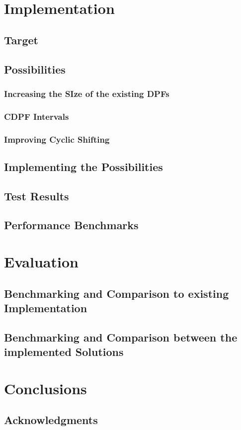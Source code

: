 \documentclass[fleqn,10pt]{olplainarticle}
\begin{document}
\section{Implementation}
\subsection{Target}

\subsection{Possibilities}

\subsubsection{Increasing the SIze of the existing DPFs}

\subsubsection{CDPF Intervals}

\subsubsection{Improving Cyclic Shifting}

\subsection{Implementing the Possibilities}

\subsection{Test Results}

\subsection{Performance Benchmarks}


\section{Evaluation}
\subsection{Benchmarking and Comparison to existing Implementation}

\subsection{Benchmarking and Comparison between the implemented Solutions}


\section{Conclusions}


\subsection{Acknowledgments}



\end{document}
